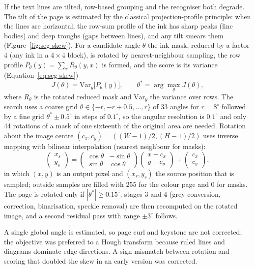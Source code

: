 If the text lines are tilted, row-based grouping and the recogniser both degrade.
The tilt of the page is estimated by the classical projection-profile principle: when the lines are horizontal, the row-sum profile of the ink has sharp peaks (line bodies) and deep troughs (gaps between lines), and any tilt smears them (Figure~\ref{fig:seg-skew}).
For a candidate angle $\theta$ the ink mask, reduced by a factor 4 (any ink in a $4\times4$ block), is rotated by nearest-neighbour sampling, the row profile $P_\theta(y)=\sum_xR_\theta(y,x)$ is formed, and the score is its variance (Equation~\ref{eq:seg-skew})
\begin{equation}
J(\theta)=\mathrm{Var}_y\bigl[P_\theta(y)\bigr],\qquad \theta^*=\arg\max_\theta J(\theta),
\label{eq:seg-skew}
\end{equation}
where $R_\theta$ is the rotated reduced mask and $\mathrm{Var}_y$ the variance over rows.
The search uses a coarse grid $\theta\in\{-r,-r+0.5,\ldots,r\}$ of 33 angles for $r=8^\circ$ followed by a fine grid $\theta^*\pm0.5^\circ$ in steps of $0.1^\circ$, so the angular resolution is $0.1^\circ$ and only 44 rotations of a mask of one sixteenth of the original area are needed.
Rotation about the image centre $(c_x,c_y)=((W-1)/2,(H-1)/2)$ uses inverse mapping with bilinear interpolation (nearest neighbour for masks):
\begin{equation}
\begin{pmatrix}x_s\\y_s\end{pmatrix}=\begin{pmatrix}\cos\theta&-\sin\theta\\ \sin\theta&\cos\theta\end{pmatrix}\begin{pmatrix}x-c_x\\y-c_y\end{pmatrix}+\begin{pmatrix}c_x\\c_y\end{pmatrix},
\label{eq:seg-rot}
\end{equation}
in which $(x,y)$ is an output pixel and $(x_s,y_s)$ the source position that is sampled; outside samples are filled with 255 for the colour page and 0 for masks.
The page is rotated only if $|\theta^*|\ge0.15^\circ$; stages 3 and 4 (grey conversion, correction, binarisation, speckle removal) are then recomputed on the rotated image, and a second residual pass with range $\pm3^\circ$ follows.


A single global angle is estimated, so page curl and keystone are not corrected; the objective was preferred to a Hough transform because ruled lines and diagrams dominate edge directions. A sign mismatch between rotation and scoring that doubled the skew in an early version was corrected.


